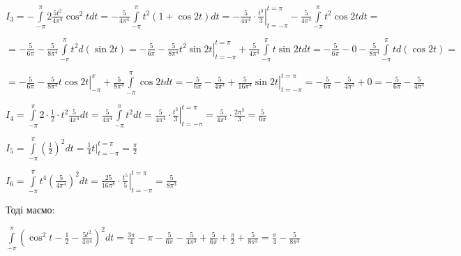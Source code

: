 \documentclass[a5paper, 20pt, titlepage]{article}
\newcommand{\Int}[1]{\int \limits_{-\pi}^{\pi} #1 dt}
\begin{document}
\vspace{5mm}
\hspace{4mm}
$I_3 = -\Int{2  \frac{5t^2}{4 \pi^4} \cos^2 t } = -\frac{5}{4\pi^4} \Int{t^2(1 + \cos 2t)} = - \left. \frac{5}{4\pi^4} \cdot \frac{t^3}{3} \right|_{t = - \pi}^{t = \pi} - \frac{5}{4 \pi^4} \int \limits_{-\pi}^{\pi} t^2 \cos 2t dt =$

\vspace{5mm}
\hspace{8mm}
$= -\frac{5}{6 \pi} - \frac{5}{8 \pi^4} \int \limits_{-\pi}^{\pi} t^2 d(\sin 2t) = -\frac{5}{6 \pi} - \left. \frac{5}{8 \pi^4} t^2 \sin 2t \right|_{t = -\pi}^{t = \pi} +
\frac{5}{4\pi^4} \Int{t \sin 2t} = -\frac{5}{6\pi} - 0 - \frac{5}{8 \pi^4} \int \limits_{-\pi}^{\pi} t d(\cos 2t) = $

\vspace{5mm}
\hspace{8mm}
$= -\frac{5}{6\pi} - \left. \frac{5}{8 \pi^4} t \cos 2t \right|_{-\pi}^{\pi} + \frac{5}{8 \pi^4} \Int{\cos 2t} = - \frac{5}{6 \pi} - \frac{5}{4 \pi^3} + \left. \frac{5}{16 \pi^4} \sin 2t \right|_{t = -\pi}^{t = \pi} =  - \frac{5}{6 \pi} - \frac{5}{4 \pi^3} + 0 =  - \frac{5}{6 \pi} - \frac{5}{4 \pi^3}$

\vspace{5mm}
\hspace{4mm}
$I_4 = \Int{2 \cdot \frac{1}{2} \cdot t^2 \frac{5}{4 \pi^4}} = \frac{5}{4 \pi^4} \Int{t^2} = \frac{5}{4 \pi^4}  \cdot \left. \frac{t^3}{3} \right|_{t = -\pi}^{t = \pi} = \frac{5}{4 \pi^4} \cdot \frac{2 \pi^3}{3} = \frac{5}{6 \pi}$

\vspace{5mm}
\hspace{4mm}
$I_5 =  \Int{ \left( \frac{1}{2} \right)^2} = \frac{1}{4} \left. t \right|_{t = -\pi}^{t = \pi} = \frac{\pi}{2}$

\vspace{5mm}
\hspace{4mm}
$I_6 = \Int{t^4\left(\frac{5}{4 \pi^4} \right)^2} = \left. \frac{25}{16 \pi^8} \cdot \frac{t^5}{5} \right|_{t = -\pi}^{t = \pi} = \frac{5}{8 \pi^3}$

\vspace{3mm}
Тоді маємо:

\vspace{3mm}
$\Int{\left( \cos^2 t - \frac{1}{2} - \frac{5t^2}{4 \pi^4} \right)^2} = \frac{3 \pi}{4} - \pi - \frac{5}{6\pi} - \frac{5}{4 \pi^3} + \frac{5}{6 \pi} + \frac{\pi}{2} + \frac{5}{8 \pi^3} =  \frac{\pi}{4} - \frac{5}{8 \pi^3} $
\end{document}
